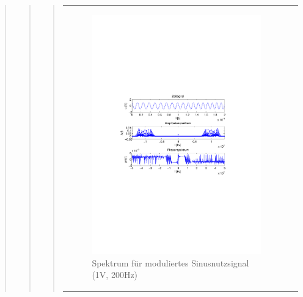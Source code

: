 \begin{quote}
\begin{quote}
\begin{quote}
\begin{center}
\begin{tabular}{ll}
\begin{minipage}{0.6\textwidth}
                \end{minipage}
                \begin{minipage}{0.6\textwidth}

                     \begin{figure}[H]
                        \label{fig:}
                        \includegraphics[scale=0.5, trim = 2cm 6.5cm 1.5cm
                        8.5cm, clip]{./Bilder/sin_a1_f200}
                        \caption{Spektrum für moduliertes Sinusnutzsignal (1V,
                        200Hz)}
                    \end{figure}
               \vspace{-1.5em}

                \end{minipage}


\end{tabular}
\end{center}
\end{quote}
\end{quote}
\end{quote}
